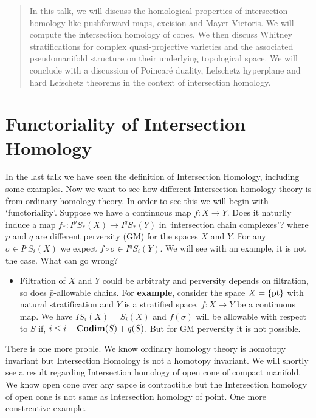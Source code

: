 \documentclass[11pt]{article}
\author{ \textsc{Trishan Mondal} \\[0.15cm]
  \href{https://www.isibang.ac.in}{Indian Statistical Institute, Bangalore}}
\date{}
\begin{document}
\maketitle 

\begin{abstract}
    \noindent In this talk, we will discuss the homological properties of intersection homology like pushforward maps, excision and Mayer-Vietoris. We will compute the intersection homology of cones. We then discuss Whitney stratifications for complex quasi-projective varieties and the associated pseudomanifold structure on their underlying topological space. We will conclude with a discussion of Poincaré duality, Lefschetz hyperplane and hard Lefschetz theorems in the context of intersection homology.
\end{abstract}

\section{Functoriality of Intersection Homology}

\noindent In the last talk we have seen the definition of Intersection Homology, including some examples. Now we want to see how different Intersection homology theory is from ordinary homology theory. In order to see this we will begin with `functoriality'. Suppose we have a continuous map $f:X\to Y$. Does it naturlly induce a map $f_{\ast} : I^{p}S_{\ast}(X)\to I^{q}S_{\ast}(Y)$ in `intersection chain complexes'? where $p$ and $q$ are different perversity (GM) for the spaces $X$ and $Y$. For any $\sigma \in I^pS_{i}(X)$ we expect $f \circ \sigma \in I^qS_i(Y)$. We will see with an example, it is not the case. What can go wrong? 

\begin{itemize}
    \item[] Filtration of $X$ and $Y$ could be arbitraty and perversity depends on filtration, so does $\bar{p}$-allowable chains. For \textbf{example}, consider the space $X = \qty{\text{pt}}$ with natural stratification and $Y$ is a stratified space. $f:X \to Y$ be a continuous map. We have $IS_i(X)=S_i(X)$ and $f(\sigma)$ will be allowable with respect to $S$ if, $i \leq i -\mathbf{Codim} (S) + \bar{q}(S)$. But for GM perversity it is not possible. 
\end{itemize}

\noindent There is one more proble. We know ordinary homology theory is homotopy invariant but Intersection Homology is not a homotopy invariant. We will shortly see a result regarding Intersection homology of open cone of compact manifold. We know open cone over any sapce is contractible  but the Intersection homology of open cone is not same as Intersection homology of point. One more constrcutive example. 
\end{document}
